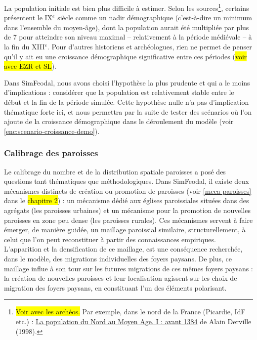 La population initiale est bien plus difficile à estimer.
Selon les sources\footnote{
	\hl{Voir avec les archéos.}
	Par exemple, dans le nord de la France (Picardie, IdF etc.) :  \og \href{https://www.persee.fr/doc/rnord_0035-2624_1998_num_80_326_2872}{La population du Nord au Moyen Age. I : avant 1384}\fg{} de Alain Derville (1998).
}, certains présentent le IX$^e$ siècle comme un \og nadir\fg{} démographique (c'est-à-dire un minimum dans l'ensemble du moyen-âge), dont la population aurait été multipliée par plus de 7 pour atteindre son niveau maximal -- relativement à la période médiévale -- à la fin du XIII$^e$.
Pour d'autres historiens et archéologues, rien ne permet de penser qu'il y ait eu une croissance démographique significative entre ces périodes (\hl{voir avec EZR et SL}).

Dans SimFeodal, nous avons choisi l'hypothèse la plus prudente et qui a le moins d'implications : considérer que la population est relativement stable entre le début et la fin de la période simulée.
Cette \og hypothèse nulle\fg{} n'a pas d'implication thématique forte ici, et nous permettra par la suite de tester des scénarios où l'on ajoute de la croissance démographique dans le déroulement du modèle (voir \cref{enc:scenario-croissance-demo}).


\subsubsection{Calibrage des paroisses}

Le calibrage du nombre et de la distribution spatiale paroisses a posé des questions tant thématiques que méthodologiques.
Dans SimFeodal, il existe deux mécanismes distincts de création ou promotion de paroisses (voir \cref{meca-paroisses} dans le \hl{chapitre 2}) : un mécanisme dédié aux églises paroissiales situées dans des agrégats (les paroisses \og urbaines\fg{}) et un mécanisme pour la promotion de nouvelles paroisses en zone peu dense (les paroisses \og rurales\fg{}).
Ces mécanismes servent à faire émerger, de manière guidée, un maillage paroissial similaire, structurellement, à celui que l'on peut reconstituer à partir des connaissances empiriques.
L'apparition et la densification de ce maillage, est une conséquence recherchée, dans le modèle, des migrations individuelles des foyers paysans.
De plus, ce maillage influe à son tour sur les futures migrations de ces mêmes foyers paysans : la création de nouvelles paroisses et leur localisation agissent sur les choix de migration des foyers paysans, en constituant l'un des éléments polarisant.

